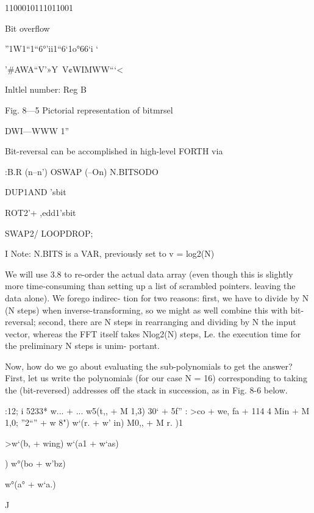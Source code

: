 1100010111011001

Bit overﬂow

”1W1“1“6°’ii1“6‘1o°66‘i ‘

'#AWA“V’»Y~V¢WIMWW“‘<%

Inltlel number: Reg B

 

 

 

 

 

Fig. 8—5 Pictorial representation of bitmrsel

DWI—WWW 1”

Bit-reversal can be accomplished in high-level FORTH via

:B.R (n--n') \reverseorderoibits
OSWAP (--On) \eetupstack
N.BITSODO

DUP1AND 'sbit

ROT2'+ ,edd1'sbit

SWAP2/ \rightoshittn
LOOPDROP;

I Note: N.BITS is a VAR, previously set to v = log2(N)

We will use 3.8 to re-order the actual data array (even though
this is slightly more time-consuming than setting up a list of
scrambled pointers. leaving the data alone). We forego indirec-
tion for two reasons: ﬁrst, we have to divide by N (N steps) when
inverse-transforming, so we might as well combine this with
bit-reversal; second, there are N steps in rearranging and dividing
by N the input vector, whereas the FFT itself takes Nlog2(N)
steps, Le. the execution time for the preliminary N steps is unim-
portant.

Now, how do we go about evaluating the sub-polynomials to get
the answer? First, let us write the polynomials (for our case
N = 16) corresponding to taking the (bit-reversed) addresses off
the stack in succession, as in Fig. 8-6 below.

 

 

:12; i 5233* w... + ...
w5(t,, + M 1,3)
30‘ + 5f” : >co + we,
fa + 114 4
Min + M 1,0; ”2“” + w 8")
w‘(r. + w’ in)
M0,, + M r. )1

>w‘(b, + wing)
w‘(a1 + w‘as)

) w°(bo + w’bz)

w°(a° + w‘a.)

 

 

 

J

